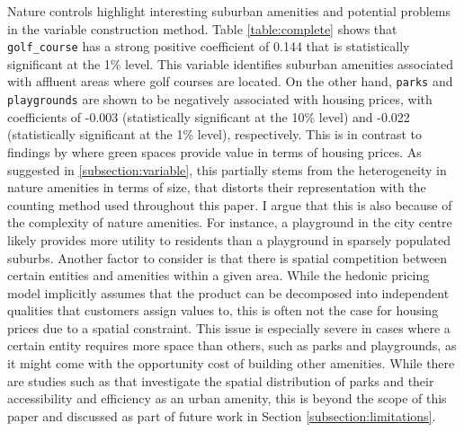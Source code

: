 \documentclass{article}
\begin{document}
Nature controls highlight interesting suburban amenities and potential problems in the variable construction method. Table \ref{table:complete} shows that \texttt{golf\_course} has a strong positive coefficient of 0.144 that is statistically significant at the 1\% level. This variable identifies suburban amenities associated with affluent areas where golf courses are located. On the other hand, \texttt{parks} and \texttt{playgrounds} are shown to be negatively associated with housing prices, with coefficients of -0.003 (statistically significant at the 10\% level) and -0.022 (statistically significant at the 1\% level), respectively. This is in contrast to findings by \citet{Gibbons2014TheApproach} where green spaces provide value in terms of housing prices. As suggested in \ref{subsection:variable}, this partially stems from the heterogeneity in nature amenities in terms of size, that distorts their representation with the counting method used throughout this paper. I argue that this is also because of the complexity of nature amenities. For instance, a playground in the city centre likely provides more utility to residents than a playground in sparsely populated suburbs. Another factor to consider is that there is spatial competition between certain entities and amenities within a given area. While the hedonic pricing model implicitly assumes that the product can be decomposed into independent qualities that customers assign values to, this is often not the case for housing prices due to a spatial constraint. This issue is especially severe in cases where a certain entity requires more space than others, such as parks and playgrounds, as it might come with the opportunity cost of building other amenities. While there are studies such as \citet{Niu2018DetailedWuhan} that investigate the spatial distribution of parks and their accessibility and efficiency as an urban amenity, this is beyond the scope of this paper and discussed as part of future work in Section \ref{subsection:limitations}.\\\\
\end{document}
